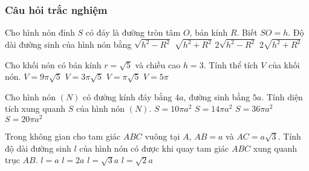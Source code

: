 \subsubsection{Câu hỏi trắc nghiệm}
\begin{ex}%
	Cho hình nón đỉnh $S$ có đáy là đường tròn tâm $O$, bán kính $R$. Biết $SO=h$. Độ dài đường sinh của hình nón bằng
	\choice
	{$\sqrt{h^2-R^2}$}
	{\True $\sqrt{h^2+R^2}$}
	{$2\sqrt{h^2-R^2}$}
	{$2\sqrt{h^2+R^2}$}
\end{ex}
\begin{ex}%
	Cho khối nón có bán kính $r=\sqrt{5}$ và chiều cao $h=3$. Tính thể tích $V$ của khối nón. 
	\choice
	{$V=9\pi\sqrt{5}$}
	{$V=3\pi\sqrt{5}$}
	{$V=\pi\sqrt{5}$}
	{\True $V=5\pi$}
\end{ex}
\begin{ex}%
	Cho hình nón $(N)$ có đường kính đáy bằng $4a$, đường sinh bằng $5a$. Tính diện tích xung quanh $S$ của hình nón $(N)$. 
	\choice
	{\True $S=10\pi a^2$}
	{$S=14\pi a^2$}
	{$S=36\pi a^2$}
	{$S=20\pi a^2$}
\end{ex}
\begin{ex}%
	Trong không gian cho tam giác $ABC$ vuông tại $A$, $AB=a$ và $AC=a\sqrt{3}$. Tính độ dài đường sinh $l$ của hình nón có được khi quay tam giác $ABC$ xung quanh trục $AB$. 
	\choice
	{$l=a$}
	{\True $l=2a$}
	{$l=\sqrt{3}a$}
	{$l=\sqrt{2}a$}
\end{ex}
